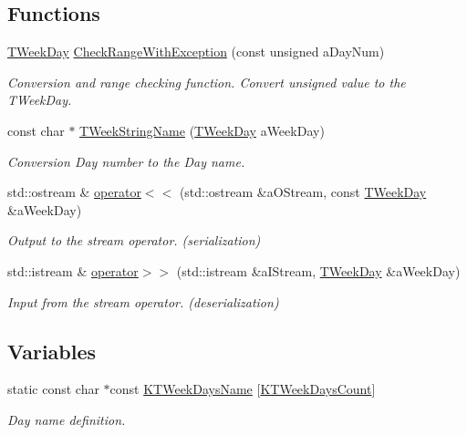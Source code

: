 \subsection*{Functions}
\begin{DoxyCompactItemize}
\item 
\hyperlink{namespace_c_value___t_week_day_a6412f204509f223b789fb5f1a61a6124}{T\+Week\+Day} \hyperlink{namespace_c_value___t_week_day_ae635bc6aae42ff925b25ce335390083b}{Check\+Range\+With\+Exception} (const unsigned a\+Day\+Num)
\begin{DoxyCompactList}\small\item\em Conversion and range checking function. Convert {\ttfamily unsigned} value to the T\+Week\+Day. \end{DoxyCompactList}\item 
const char $\ast$ \hyperlink{namespace_c_value___t_week_day_ad69753a29bce4084fa5dc888526b2bf2}{T\+Week\+String\+Name} (\hyperlink{namespace_c_value___t_week_day_a6412f204509f223b789fb5f1a61a6124}{T\+Week\+Day} a\+Week\+Day)
\begin{DoxyCompactList}\small\item\em Conversion Day number to the Day name. \end{DoxyCompactList}\item 
std\+::ostream \& \hyperlink{namespace_c_value___t_week_day_a0783ff307d102432c842a4d943b3d063}{operator$<$$<$} (std\+::ostream \&a\+O\+Stream, const \hyperlink{namespace_c_value___t_week_day_a6412f204509f223b789fb5f1a61a6124}{T\+Week\+Day} \&a\+Week\+Day)
\begin{DoxyCompactList}\small\item\em Output to the stream operator. ({\itshape serialization}) \end{DoxyCompactList}\item 
std\+::istream \& \hyperlink{namespace_c_value___t_week_day_ada60106206184e32b42cc05978db4d37}{operator$>$$>$} (std\+::istream \&a\+I\+Stream, \hyperlink{namespace_c_value___t_week_day_a6412f204509f223b789fb5f1a61a6124}{T\+Week\+Day} \&a\+Week\+Day)
\begin{DoxyCompactList}\small\item\em Input from the stream operator. ({\itshape deserialization}) \end{DoxyCompactList}\end{DoxyCompactItemize}
\subsection*{Variables}
\begin{DoxyCompactItemize}
\item 
static const char $\ast$const \hyperlink{namespace_c_value___t_week_day_a1c30aa5c20b662fe3dd12e7c26507d27}{K\+T\+Week\+Days\+Name} \mbox{[}\hyperlink{namespace_c_value___t_week_day_aafc13db7f1761bc02fc24499d9d30ef8aa662532b91895c243892c79eaafea534}{K\+T\+Week\+Days\+Count}\mbox{]}
\begin{DoxyCompactList}\small\item\em Day name definition. \end{DoxyCompactList}\end{DoxyCompactItemize}


